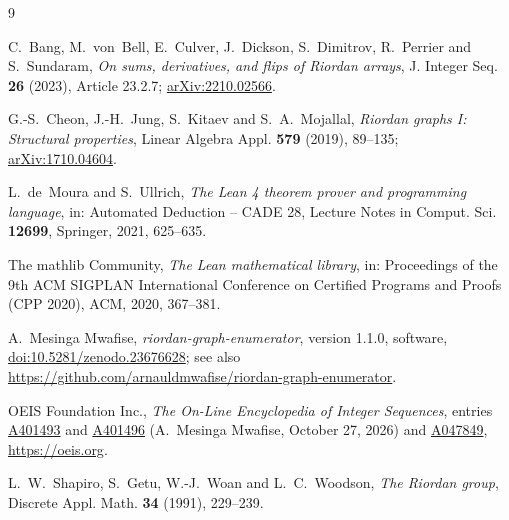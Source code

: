 \documentclass[11pt,a4paper]{amsart}
\theoremstyle{definition}
\theoremstyle{remark}
\newcommand{\oeis}[1]{\href{https://oeis.org/#1}{#1}}
\begin{document}
\begin{thebibliography}{9}

C.~Bang, M.~von~Bell, E.~Culver, J.~Dickson, S.~Dimitrov, R.~Perrier and S.~Sundaram,
\emph{On sums, derivatives, and flips of Riordan arrays},
J. Integer Seq. \textbf{26} (2023), Article 23.2.7;
\href{https://arxiv.org/abs/2210.02566}{arXiv:2210.02566}.

G.-S.~Cheon, J.-H.~Jung, S.~Kitaev and S.~A.~Mojallal,
\emph{Riordan graphs I: Structural properties},
Linear Algebra Appl. \textbf{579} (2019), 89--135;
\href{https://arxiv.org/abs/1710.04604}{arXiv:1710.04604}.

L.~de~Moura and S.~Ullrich,
\emph{The Lean 4 theorem prover and programming language},
in: Automated Deduction -- CADE 28, Lecture Notes in Comput. Sci. \textbf{12699}, Springer, 2021, 625--635.

The mathlib Community,
\emph{The Lean mathematical library},
in: Proceedings of the 9th ACM SIGPLAN International Conference on Certified Programs and Proofs (CPP 2020), ACM, 2020, 367--381.

A.~Mesinga Mwafise,
\emph{riordan-graph-enumerator}, version 1.1.0, software,
\href{https://doi.org/10.5281/zenodo.23676628}{doi:10.5281/zenodo.23676628};
see also \url{https://github.com/arnauldmwafise/riordan-graph-enumerator}.

OEIS Foundation Inc.,
\emph{The On-Line Encyclopedia of Integer Sequences},
entries \oeis{A401493} and \oeis{A401496} (A.~Mesinga Mwafise, October 27, 2026) and \oeis{A047849},
\url{https://oeis.org}.

L.~W.~Shapiro, S.~Getu, W.-J.~Woan and L.~C.~Woodson,
\emph{The Riordan group},
Discrete Appl. Math. \textbf{34} (1991), 229--239.

\end{thebibliography}
\end{document}
